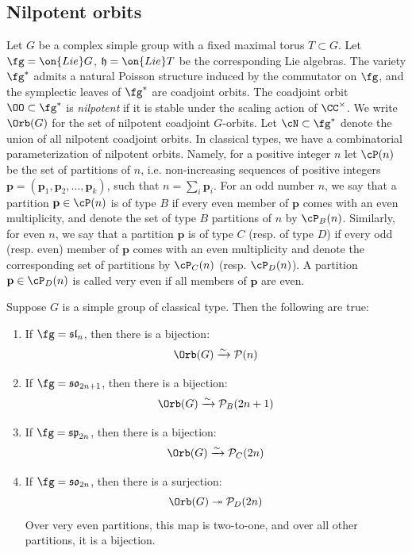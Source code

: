 \documentclass[12pt]{amsart}
\begin{document}
\subsection{Nilpotent orbits}\label{subsec_saturation}
    Let $G$ be a complex simple group with a fixed maximal torus $T \subset G$. Let $\fg=\on{Lie}G$, $\mathfrak{h}=\on{Lie}T$ be the corresponding Lie algebras. The variety $\fg^*$ admits a natural Poisson structure induced by the commutator on $\fg$, and the symplectic leaves of $\fg^*$ are coadjoint orbits. The coadjoint orbit $\OO\subset \fg^*$ is \emph{nilpotent} if it is stable under the scaling action of $\CC^\times$. We write $\Orb(G)$ for the set of nilpotent coadjoint $G$-orbits. Let $\cN\subset \fg^*$ denote the union of all nilpotent coadjoint orbits. In classical types, we have a combinatorial parameterization of nilpotent orbits. Namely, for a positive integer $n$ let $\cP(n)$ be the set of partitions of $n$, i.e. non-increasing sequences of positive integers $\mathbf{p}=(\mathbf{p}_1, \mathbf{p}_2, \ldots, \mathbf{p}_k)$, such that $n=\sum_i \mathbf{p}_i$. For an odd number $n$, we say that a partition $\mathbf{p}\in \cP(n)$ is of type $B$ if every even member of $\mathbf{p}$ comes with an even multiplicity, and denote the set of type $B$ partitions of $n$ by $\cP_B(n)$. Similarly, for even $n$, we say that a partition $\mathbf{p}$ is of type $C$ (resp. of type $D$) if every odd (resp. even) member of $\mathbf{p}$ comes with an even multiplicity and denote the corresponding set of partitions by $\cP_C(n)$ (resp. $\cP_D(n)$). A partition $\mathbf{p}\in \cP_D(n)$ is called very even if all members of $\mathbf{p}$ are even.

    \begin{prop}\label{prop:orbitstopartitions}
Suppose $G$ is a simple group of classical type. Then the following are true:
\begin{enumerate}[label=(\alph*)]
    \item If $\fg = \mathfrak{sl}_{n}$, then there is a bijection:
    $$\Orb(G) \xrightarrow{\sim} \mathcal{P}(n) $$
    \item If $\fg = \mathfrak{so}_{2n+1}$, then there is a bijection:
    $$\Orb(G)\xrightarrow{\sim} \mathcal{P}_{B}(2n+1) $$
    \item If $\fg = \mathfrak{sp}_{2n}$, then there is a bijection:
    $$ \Orb(G)\xrightarrow{\sim} \mathcal{P}_C(2n)$$
    \item If $\fg = \mathfrak{so}_{2n}$, then there is a surjection:
    $$\Orb(G) \twoheadrightarrow \mathcal{P}_{D}(2n) $$
    Over very even partitions, this map is two-to-one, and over all other partitions, it is a bijection.
\end{enumerate}
\end{prop}
\end{document}
